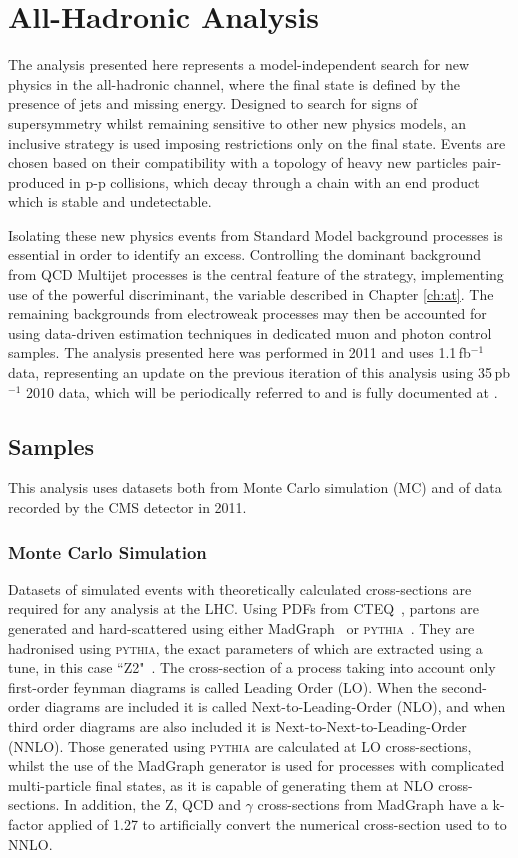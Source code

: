 \chapter{All-Hadronic Analysis}
\label{ch:ra1}
The analysis presented here represents a model-independent search for new physics in the all-hadronic channel, where the final state is defined by the presence of jets and missing energy. Designed to search for signs of supersymmetry whilst remaining sensitive to other new physics models, an inclusive strategy is used imposing restrictions only on the final state. Events are chosen based on their compatibility with a topology of heavy new particles pair-produced in p-p collisions, which decay through a chain with an end product which is stable and undetectable.

Isolating these new physics events from Standard Model background processes is essential in order to identify an excess. Controlling the dominant background from QCD Multijet processes is the central feature of the strategy, implementing use of the powerful discriminant, the \alt variable described in Chapter \ref{ch:at}. The remaining backgrounds from electroweak processes may then be accounted for using data-driven estimation techniques in dedicated muon and photon control samples. The analysis presented here was performed in 2011 and uses 1.1\,fb$^{-1}$ data, representing an update on the previous iteration of this analysis using 35\,pb$^{-1}$ 2010 data, which will be periodically referred to and is fully documented at \cite{35paper}.



\section{Samples}
This analysis uses datasets both from Monte Carlo simulation (MC) and of data recorded by the CMS detector in 2011.

\subsection{Monte Carlo Simulation}
Datasets of simulated events with theoretically calculated cross-sections are required for any analysis at the LHC. Using PDFs from CTEQ~\cite{CTEQ}, partons are generated and hard-scattered using either MadGraph~\cite{madgraph} or \textsc{pythia}~\cite{pythia}. They are hadronised using \textsc{pythia}, the exact parameters of which are extracted using a tune, in this case ``Z2"~\cite{tuneZ2}.
The cross-section of a process taking into account only first-order feynman diagrams is called Leading Order (LO). When the second-order diagrams are included it is called Next-to-Leading-Order (NLO), and when third order diagrams are also included it is Next-to-Next-to-Leading-Order (NNLO).   Those generated using \textsc{pythia} are calculated at LO cross-sections, whilst the use of the MadGraph generator is used for processes with complicated multi-particle final states, as it is capable of generating them at NLO cross-sections. In addition, the Z, QCD and $\gamma$ cross-sections from MadGraph have a k-factor applied of 1.27 to artificially convert the numerical cross-section used to to NNLO.

